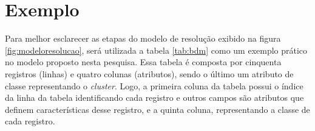 \section{Exemplo} \label{cap:ferramentas:sec:exebasemodfic}

Para melhor esclarecer as etapas do modelo de resolução exibido na figura \ref{fig:modeloresolucao}, será utilizada a tabela \ref{tab:bdm} como um exemplo prático no modelo proposto nesta pesquisa. Essa tabela é composta por cinquenta registros (linhas) e quatro colunas (atributos), sendo o último um atributo de classe representando o \textit{cluster}. Logo, a primeira coluna da tabela possui o índice da linha da tabela identificando cada registro e outros campos são atributos que definem características desse registro, e a quinta coluna, representando a classe de cada registro.

